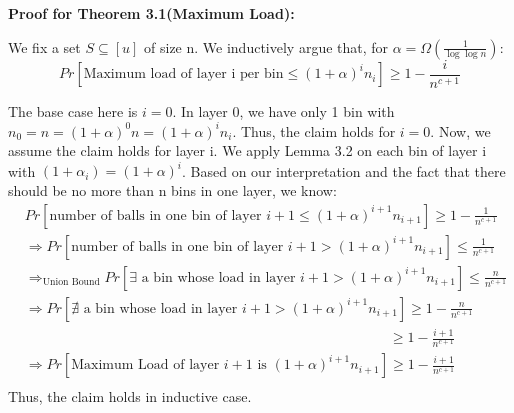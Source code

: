 \documentclass[a4paper, english]{paper}
\begin{document}
	\noindent\textbf{Proof for Theorem 3.1(Maximum Load):} \par
	We fix a set $S\subseteq[u]$ of size n. We inductively argue that, for $\alpha = \Omega(\frac1{\log\log n})$:
	$$Pr\left[\text{Maximum load of layer i per bin}\le(1+\alpha)^in_i\right]\ge1-\frac i{n^{c+1}}$$\par
	The base case here is $i = 0$. In layer 0, we have only 1 bin with $n_0=n=(1+\alpha)^0n = (1+\alpha)^in_i$. Thus, the claim holds for $i=0$. Now, we assume the claim holds for layer i. We apply Lemma 3.2 on each bin of layer i with $(1+\alpha_i) = (1+\alpha)^i$. Based on our interpretation and the fact that there should be no more than n bins in one layer, we know:
\begin{align*}
&Pr\left[ \text{number of balls in one bin of layer }i+1\le (1+\alpha)^{i+1}n_{i+1}\right] \ge 1-\frac1{n^{c+1}}\\ 
&\Rightarrow Pr\left[ \text{number of balls in one bin of layer }i+1> (1+\alpha)^{i+1}n_{i+1}\right] \le \frac1{n^{c+1}}\\
&\Rightarrow_{\text{Union Bound}} Pr\left[ \exists \text{ a bin whose load in layer }i+1> (1+\alpha)^{i+1}n_{i+1}\right] \le \frac n{n^{c+1}}\\
&\Rightarrow Pr\left[ \nexists \text{ a bin whose load in layer }i+1> (1+\alpha)^{i+1}n_{i+1}\right] \ge 1-\frac n{n^{c+1}}\\
&\qquad\qquad\qquad\qquad\qquad\qquad\qquad\qquad\qquad\qquad\qquad\qquad\qquad\ge 1-\frac {i+1}{n^{c+1}}\\
&\Rightarrow Pr\left[ \text{Maximum Load of layer }i+1 \text{ is } (1+\alpha)^{i+1}n_{i+1}\right] \ge 1-\frac {i+1}{n^{c+1}}\\
\end{align*}
\quad  \text{ }Thus, the claim holds in inductive case.\\
\end{document}
